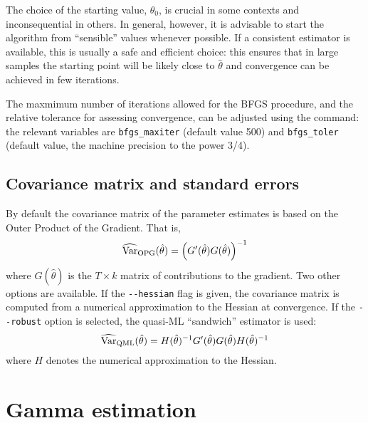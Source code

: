 The choice of the starting value, $\theta_0$, is crucial in some contexts
and inconsequential in others. In general, however, it is
advisable to start the algorithm from ``sensible'' values whenever
possible. If a consistent estimator is available, this is usually a
safe and efficient choice: this ensures that in large samples the
starting point will be likely close to $\hat{\theta}$ and convergence
can be achieved in few iterations. 

The maxmimum number of iterations allowed for the BFGS procedure, and
the relative tolerance for assessing convergence, can be adjusted
using the  command: the relevant variables are
\verb+bfgs_maxiter+ (default value 500) and \verb+bfgs_toler+ (default
value, the machine precision to the power 3/4).

\subsection{Covariance matrix and standard errors}

By default the covariance matrix of the parameter estimates is
based on the Outer Product of the Gradient.  That is,
\[
\widehat{\mbox{Var}}_{\mbox{\scriptsize OPG}}(\hat{\theta}) =
  \left(G'(\hat{\theta}) G(\hat{\theta}) \right)^{-1}
\]
where $G(\hat{\theta})$ is the $T \times k$ matrix of contributions to
the gradient.  Two other options are available.  If the
\verb|--hessian| flag is given, the covariance matrix is computed from
a numerical approximation to the Hessian at convergence.  If the
\verb|--robust| option is selected, the quasi-ML ``sandwich''
estimator is used:
\[
\widehat{\mbox{Var}}_{\mbox{\scriptsize QML}}(\hat{\theta}) = H(\hat{\theta})^{-1}
  G'(\hat{\theta}) G(\hat{\theta}) H(\hat{\theta})^{-1}
\]
where $H$ denotes the numerical approximation to the Hessian.

\section{Gamma estimation}
\label{sec:gamma}

